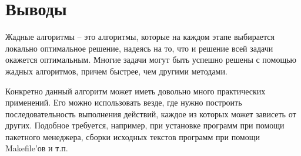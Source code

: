 \section{Выводы}

Жадные алгоритмы -- это алгоритмы, которые на каждом этапе выбирается локально оптимальное решение, надеясь на то, что и решение всей задачи окажется оптимальным. Многие задачи могут быть успешно решены с помощью жадных алгоритмов, причем быстрее, чем другими методами.\newline

Конкретно данный алгоритм может иметь довольно много практических применений. Его можно использовать везде, где нужно построить последовательность выполнения действий, каждое из которых может зависеть от других. Подобное требуется, например, при установке программ при помощи пакетного менеджера, сборки исходных текстов программ при помощи Makefile'ов и т.п. \newline

\pagebreak
